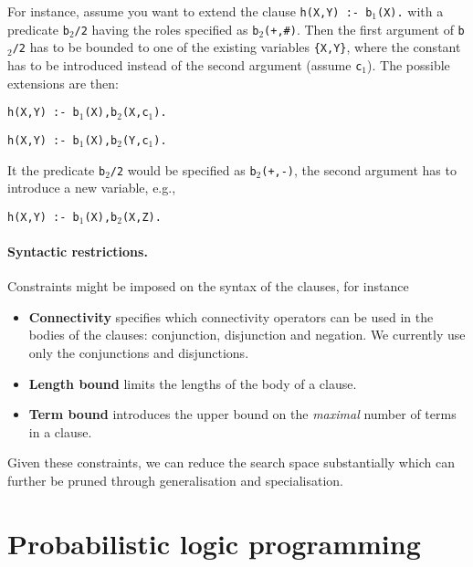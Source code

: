 For instance, assume you want to extend the clause \texttt{h(X,Y) :- b$_1$(X).} with a predicate \texttt{b$_2$/2} having the roles specified as \texttt{b$_2$(+,\#)}.
Then the first argument of \texttt{b$_2$/2} has to be bounded to one of the existing variables \texttt{\{X,Y\}}, where the constant has to be introduced instead of the second argument (assume \texttt{c$_1$}).
The possible extensions are then:
\begin{center}
	\texttt{h(X,Y) :- b$_1$(X),b$_2$(X,c$_1$).}


	\texttt{h(X,Y) :- b$_1$(X),b$_2$(Y,c$_1$).}
\end{center}

It the predicate \texttt{b$_2$/2} would be specified as \texttt{b$_2$(+,-)}, the second argument has to introduce a new variable, e.g.,
\begin{center}
	\texttt{h(X,Y) :- b$_1$(X),b$_2$(X,Z).}
\end{center}


\paragraph{Syntactic restrictions.}
Constraints might be imposed on the syntax of the clauses, for instance
\begin{itemize}
	\item \textbf{Connectivity} specifies which connectivity operators can be used in the bodies of the clauses: conjunction, disjunction and negation. We currently use only the conjunctions and disjunctions.
	\item \textbf{Length bound} limits the lengths of the body of a clause.
	\item \textbf{Term bound} introduces the upper bound on the \textit{maximal} number of terms in a clause.
\end{itemize}

Given these constraints, we can reduce the search space substantially which can further be pruned through generalisation and specialisation.









\section{Probabilistic logic programming}



